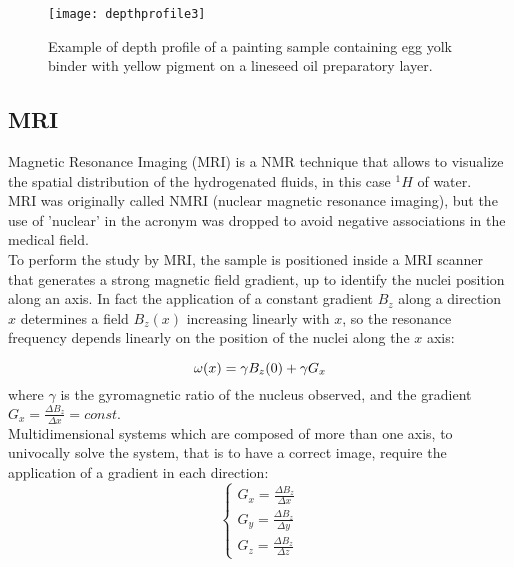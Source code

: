 \documentclass[a4paper,11pt]{report}
\begin{document}
\begin{figure}[h]
	\centering
	\texttt{[image: depthprofile3]}
	\caption{Example of depth profile of a painting sample containing egg yolk binder with yellow pigment on a lineseed oil preparatory layer\cite{marmotti}.}\label{esempiodepth}
\end{figure}

 
\subsection{MRI}
Magnetic Resonance Imaging (MRI) is a NMR technique that allows to visualize the spatial distribution of the hydrogenated fluids, in this case $^1H$ of water.\\ MRI was originally called NMRI (nuclear magnetic resonance imaging), but the use of 'nuclear' in the acronym was dropped to avoid negative associations in the medical field.\\
To perform the study by MRI, the sample is positioned inside a MRI scanner that generates a strong magnetic field gradient, up to identify the nuclei position along an axis. In fact the application of a constant gradient $B_z$ along a direction $x$ determines a field $B_z(x)$ increasing linearly with $x$, so the resonance frequency depends linearly on the position of the nuclei along the $x$ axis:

\begin{equation} \label{frequenzaMRI}
	\large{\omega(x)= \gamma B_z(0)+ \gamma G_x}
\end{equation}
where $\gamma$ is the gyromagnetic ratio of the nucleus observed, and the gradient $G_x= \frac{\Delta B_z}{\Delta x} = const.$\\
Multidimensional systems which are composed of more than one axis, to univocally solve the system, that is to have a correct image, require the application of a gradient in each direction:\\
\large{\[
\begin{cases}
G_x= \frac{\Delta B_z}{\Delta x} \\
G_y= \frac{\Delta B_z}{\Delta y} \\
G_z= \frac{\Delta B_z}{\Delta z}
\end{cases}
\]}
\\
\end{document}
